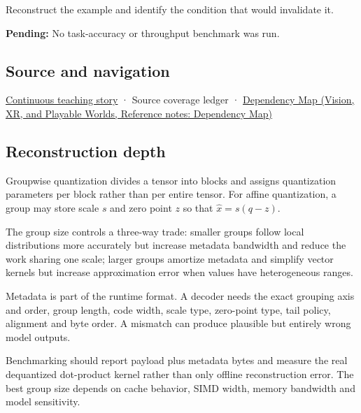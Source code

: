 Reconstruct the example and identify the condition that would invalidate it.

\textbf{Pending:} No task-accuracy or throughput benchmark was run.

\subsection{Source and navigation}\label{appendix-638204c40e8b-source-and-navigation}

\hyperref[01-foundations-i-ch001-choosing-what-information-to-keep]{Continuous teaching story} · {Source coverage ledger} · \href{../07-Vision-XR-and-Playable-Worlds/main.pdf\#nameddest=appendix-4ad47bdd269a}{Dependency Map (Vision, XR, and Playable Worlds, Reference notes: Dependency Map)}

\subsection{Reconstruction depth}\label{appendix-638204c40e8b-reconstruction-depth}

Groupwise quantization divides a tensor into blocks and assigns quantization parameters per block rather than per entire tensor. For affine quantization, a group may store scale \(s\) and zero point \(z\) so that \(\hat x=s(q-z)\).

The group size controls a three-way trade: smaller groups follow local distributions more accurately but increase metadata bandwidth and reduce the work sharing one scale; larger groups amortize metadata and simplify vector kernels but increase approximation error when values have heterogeneous ranges.

Metadata is part of the runtime format. A decoder needs the exact grouping axis and order, group length, code width, scale type, zero-point type, tail policy, alignment and byte order. A mismatch can produce plausible but entirely wrong model outputs.

Benchmarking should report payload plus metadata bytes and measure the real dequantized dot-product kernel rather than only offline reconstruction error. The best group size depends on cache behavior, SIMD width, memory bandwidth and model sensitivity.
